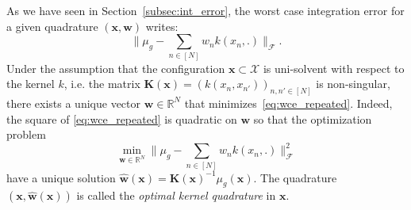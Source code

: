 \documentclass[twoside,11pt]{book}
\numberwithin{theorem}{chapter}
\numberwithin{definition}{chapter}
\numberwithin{proposition}{chapter}
\numberwithin{corollary}{chapter}
\numberwithin{example}{chapter}
\numberwithin{lemma}{chapter}
\begin{document}
As we have seen in Section~\ref{subsec:int_error}, the worst case integration error for a given quadrature $(\bm{x}, \bm{w})$ writes:
\begin{equation}\label{eq:wce_repeated}
\bigg \|\mu_{g} - \sum\limits_{n \in [N]} w_{n}k(x_{n},.) \bigg\|_{\mathcal{F}}.
\end{equation}
Under the assumption that the configuration  $\bm{x} \subset \mathcal{X}$ is uni-solvent with respect to the kernel $k$, i.e. the matrix $\bm{K}(\bm{x}) = (k(x_{n},x_{n'}))_{n,n' \in [N]}$ is non-singular, there exists a unique vector $\bm{w} \in \mathbb{R}^{N}$ that minimizes~\eqref{eq:wce_repeated}. Indeed, the square of \eqref{eq:wce_repeated} is quadratic on $\bm{w}$ so that the optimization problem
\begin{equation}\label{eq:wce_repeated_optimization}
\min\limits_{\bm{w} \in \mathbb{R}^{N}} \bigg \|\mu_{g} - \sum\limits_{n \in [N]} w_{n}k(x_{n},.) \bigg\|_{\mathcal{F}}^{2}
\end{equation}
have a unique solution $\hat{\bm{w}}(\bm{x}) = \bm{K}(\bm{x})^{-1}\mu_{g}(\bm{x})$. The quadrature $(\bm{x},\hat{\bm{w}}(\bm{x}))$ is called the \emph{optimal kernel quadrature} in $\bm{x}$. 
\end{document}
